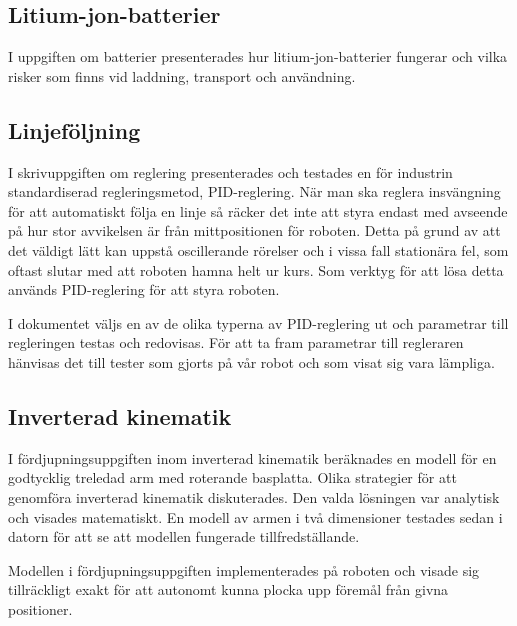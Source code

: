 \subsection{Litium-jon-batterier}

I uppgiften om batterier presenterades hur litium-jon-batterier fungerar och vilka risker som finns vid laddning, transport och användning. 

\subsection{Linjeföljning}

I skrivuppgiften om reglering presenterades och testades en för industrin standardiserad regleringsmetod, PID-reglering. När man ska reglera insvängning för att automatiskt följa en linje så räcker det inte att styra endast med avseende på hur stor avvikelsen är från mittpositionen för roboten. Detta på grund av att det väldigt lätt kan uppstå oscillerande rörelser och i vissa fall stationära fel, som oftast slutar med att roboten hamna helt ur kurs. Som verktyg för att lösa detta används PID-reglering för att styra roboten.

I dokumentet väljs en av de olika typerna av PID-reglering ut och parametrar till regleringen testas och redovisas. För att ta fram parametrar till regleraren hänvisas det till tester som gjorts på vår robot och som visat sig vara lämpliga.

\subsection{Inverterad kinematik}
I fördjupningsuppgiften inom inverterad kinematik beräknades en modell för en godtycklig treledad arm med roterande basplatta. Olika strategier för att genomföra inverterad kinematik diskuterades. Den valda lösningen var analytisk och visades matematiskt. En modell av armen i två dimensioner testades sedan i datorn för att se att modellen fungerade tillfredställande.

Modellen i fördjupningsuppgiften implementerades på roboten och visade sig tillräckligt exakt för att autonomt kunna plocka upp föremål från givna positioner.